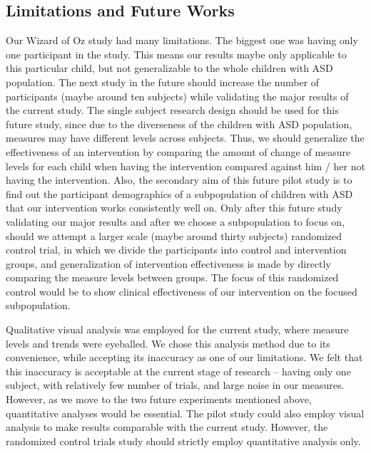 \documentclass{ut-thesis}
\begin{document}
\subsection{Limitations and Future Works}
Our Wizard of Oz study had many limitations.  The biggest one was having only one participant in the study.  This means our results maybe only applicable to this particular child, but not generalizable to the whole children with ASD population.  The next study in the future should increase the number of participants (maybe around ten subjects) while validating the major results of the current study.  The single subject research design should be used for this future study, since due to the diverseness of the children with ASD population, measures may have different levels across subjects.  Thus, we should generalize the effectiveness of an intervention by comparing the amount of change of measure levels for each child when having the intervention compared against him / her not having the intervention.  Also, the secondary aim of this future pilot study is to find out the participant demographics of a subpopulation of children with ASD that our intervention works consistently well on.  Only after this future study validating our major results and after we choose a subpopulation to focus on, should we attempt a larger scale (maybe around thirty subjects) randomized control trial, in which we divide the participants into control and intervention groups, and generalization of intervention effectiveness is made by directly comparing the measure levels between groups.  The focus of this randomized control would be to show clinical effectiveness of our intervention on the focused subpopulation.

Qualitative visual analysis was employed for the current study, where measure levels and trends were eyeballed.  We chose this analysis method due to its convenience, while accepting its inaccuracy as one of our limitations.  We felt that this inaccuracy is acceptable at the current stage of research -- having only one subject, with relatively few number of trials, and large noise in our measures.  However, as we move to the two future experiments mentioned above, quantitative analyses would be essential.  The pilot study could also employ visual analysis to make results comparable with the current study.  However, the randomized control trials study should strictly employ quantitative analysis only.
\end{document}
